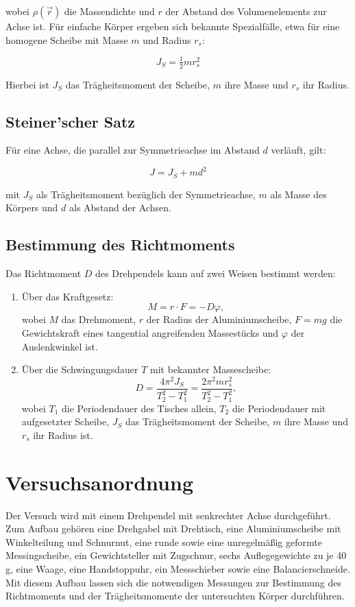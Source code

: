 wobei $\rho(\vec{r})$ die Massendichte und $r$ der Abstand des Volumenelements zur Achse ist.  
Für einfache Körper ergeben sich bekannte Spezialfälle, etwa für eine homogene Scheibe mit Masse $m$ und Radius $r_s$:

\begin{equation}
    J_S = \tfrac{1}{2} m r_s^2
\end{equation}

Hierbei ist $J_S$ das Trägheitsmoment der Scheibe, $m$ ihre Masse und $r_s$ ihr Radius.

\subsection*{Steiner’scher Satz}
Für eine Achse, die parallel zur Symmetrieachse im Abstand $d$ verläuft, gilt:

\begin{equation}
    J = J_S + md^2
\end{equation}

mit $J_S$ als Trägheitsmoment bezüglich der Symmetrieachse, $m$ als Masse des Körpers und $d$ als Abstand der Achsen.
\subsection*{Bestimmung des Richtmoments}
Das Richtmoment $D$ des Drehpendels kann auf zwei Weisen bestimmt werden:

\begin{enumerate}
    \item Über das Kraftgesetz:
    \begin{equation}
        M = r \cdot F = -D\varphi,
    \end{equation}
    wobei $M$ das Drehmoment, $r$ der Radius der Aluminiumscheibe, $F = mg$ die Gewichtskraft eines tangential angreifenden Massestücks und $\varphi$ der Auslenkwinkel ist.
    
    \item Über die Schwingungsdauer $T$ mit bekannter Massescheibe:
    \begin{equation}
        D = \frac{4\pi^2 J_S}{T_2^2 - T_1^2} = \frac{2\pi^2 m r_s^2}{T_2^2 - T_1^2},
    \end{equation}
    wobei $T_1$ die Periodendauer des Tisches allein, $T_2$ die Periodendauer mit aufgesetzter Scheibe, $J_S$ das Trägheitsmoment der Scheibe, $m$ ihre Masse und $r_s$ ihr Radius ist.
\end{enumerate}

\section{Versuchsanordnung}
    Der Versuch wird mit einem Drehpendel mit senkrechter Achse durchgeführt. Zum Aufbau gehören eine Drehgabel mit Drehtisch, eine Aluminiumscheibe mit Winkelteilung und Schnurnut, eine runde sowie eine unregelmäßig geformte Messingscheibe, ein Gewichtsteller mit Zugschnur, sechs Auflegegewichte zu je 40 g, eine Waage, eine Handstoppuhr, ein Messschieber sowie eine Balancierschneide. Mit diesem Aufbau lassen sich die notwendigen Messungen zur Bestimmung des Richtmoments und der Trägheitsmomente der untersuchten Körper durchführen.
